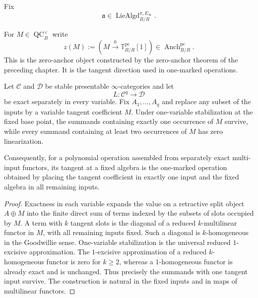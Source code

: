 Fix
\[
    \mathfrak a
    \in
    \operatorname{LieAlgd}^{\pi,E_\infty}_{B/R}.
\]

\begin{definition}
\label{def:as-zero-anchor-tangent-coefficient}
For $M\in\operatorname{QC}^{\vee}_B$ write
\[
\boxed{
    z(M)
    :=
    \left(
        M\xrightarrow{0}\mathbb T_{B/R}^{\mathrm{pc}}[1]
    \right)
    \in
    \operatorname{Anch}^{\mathrm{pc}}_{B/R}.
}
\]
This is the zero-anchor object constructed by the zero-anchor theorem of the
preceding chapter.  It is the tangent direction used in one-marked
operations.
\end{definition}

\begin{lemma}
\label{lem:as-one-marked-linearization}
Let $\mathcal C$ and $\mathcal D$ be stable presentable $\infty$-categories
and let
\[
    L:\mathcal C^q\longrightarrow\mathcal D
\]
be exact separately in every variable.  Fix $A_1,\ldots,A_q$ and replace any
subset of the inputs by a variable tangent coefficient $M$.  Under
one-variable stabilization at the fixed base point, the summands containing
exactly one occurrence of $M$ survive, while every summand containing at least
two occurrences of $M$ has zero linearization.

Consequently, for a polynomial operation assembled from separately exact
multi-input functors, its tangent at a fixed algebra is the one-marked
operation obtained by placing the tangent coefficient in exactly one input and
the fixed algebra in all remaining inputs.
\end{lemma}

\begin{proof}
Exactness in each variable expands the value on a retractive split object
$A\oplus M$ into the finite direct sum of terms indexed by the subsets of
slots occupied by $M$.  A term with $k$ tangent slots is the diagonal of a
reduced $k$-multilinear functor in $M$, with all remaining inputs fixed.
Such a diagonal is $k$-homogeneous in the Goodwillie sense.  One-variable
stabilization is the universal reduced $1$-excisive approximation.  The
$1$-excisive approximation of a reduced $k$-homogeneous functor is zero for
$k\geq2$, whereas a $1$-homogeneous functor is already exact and is unchanged.
Thus precisely the summands with one tangent input survive.  The construction
is natural in the fixed inputs and in maps of multilinear functors.
\end{proof}

